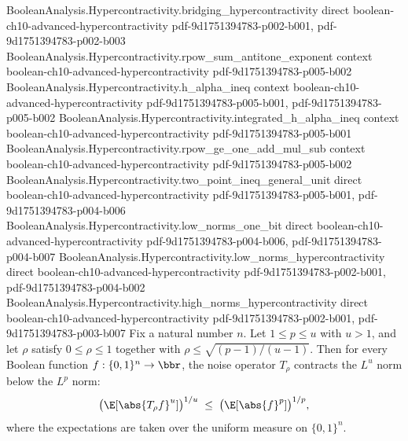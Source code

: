 \begin{theorem}
\proofstep
  {BooleanAnalysis.Hypercontractivity.bridging_hypercontractivity}
  {direct}
  {boolean-ch10-advanced-hypercontractivity}
  {pdf-9d1751394783-p002-b001,
    pdf-9d1751394783-p002-b003}
\proofstep
  {BooleanAnalysis.Hypercontractivity.rpow_sum_antitone_exponent}
  {context}
  {boolean-ch10-advanced-hypercontractivity}
  {pdf-9d1751394783-p005-b002}
\proofstep
  {BooleanAnalysis.Hypercontractivity.h_alpha_ineq}
  {context}
  {boolean-ch10-advanced-hypercontractivity}
  {pdf-9d1751394783-p005-b001,
    pdf-9d1751394783-p005-b002}
\proofstep
  {BooleanAnalysis.Hypercontractivity.integrated_h_alpha_ineq}
  {context}
  {boolean-ch10-advanced-hypercontractivity}
  {pdf-9d1751394783-p005-b001}
\proofstep
  {BooleanAnalysis.Hypercontractivity.rpow_ge_one_add_mul_sub}
  {context}
  {boolean-ch10-advanced-hypercontractivity}
  {pdf-9d1751394783-p005-b002}
\proofstep
  {BooleanAnalysis.Hypercontractivity.two_point_ineq_general_unit}
  {direct}
  {boolean-ch10-advanced-hypercontractivity}
  {pdf-9d1751394783-p005-b001,
    pdf-9d1751394783-p004-b006}
\proofstep
  {BooleanAnalysis.Hypercontractivity.low_norms_one_bit}
  {direct}
  {boolean-ch10-advanced-hypercontractivity}
  {pdf-9d1751394783-p004-b006,
    pdf-9d1751394783-p004-b007}
\proofstep
  {BooleanAnalysis.Hypercontractivity.low_norms_hypercontractivity}
  {direct}
  {boolean-ch10-advanced-hypercontractivity}
  {pdf-9d1751394783-p002-b001,
    pdf-9d1751394783-p004-b002}
\proofstep
  {BooleanAnalysis.Hypercontractivity.high_norms_hypercontractivity}
  {direct}
  {boolean-ch10-advanced-hypercontractivity}
  {pdf-9d1751394783-p002-b001,
    pdf-9d1751394783-p003-b007}
Fix a natural number $n$. Let $1 \le p \le u$ with $u > 1$, and let $\rho$ satisfy $0 \le \rho \le 1$ together
with $\rho \le \sqrt{(p-1)/(u-1)}$. Then for every Boolean function $f:\{0,1\}^n \to
\bbr$, the noise operator $T_\rho$ contracts the $L^u$ norm below the $L^p$ norm:
\[
\bigl(\E\!\left[\abs{T_\rho f}^u\right]\bigr)^{1/u} \;\le\;
\bigl(\E\!\left[\abs{f}^p\right]\bigr)^{1/p},
\]
where the expectations are taken over the uniform measure on $\{0,1\}^n$.
\end{theorem}

